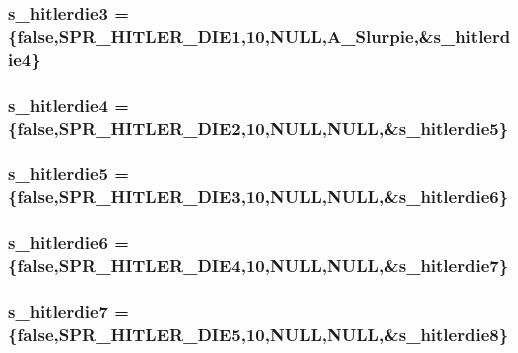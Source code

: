 \label{WL__ACT2_8C_a689a9a34510c375d3e7baf3e44a306b1}
\hypertarget{WL__ACT2_8C_a77cb0b9a6adb6ce65957e289cc3b84d5}{
\subsubsection[{s\_\-hitlerdie3}]{ {\bf s\_\-hitlerdie3} = \{false,SPR\_\-HITLER\_\-DIE1,10,NULL,A\_\-Slurpie,\&{\bf s\_\-hitlerdie4}\}}}
\label{WL__ACT2_8C_a77cb0b9a6adb6ce65957e289cc3b84d5}
\hypertarget{WL__ACT2_8C_af74ae97c693e181be0050cce42a41a60}{
\subsubsection[{s\_\-hitlerdie4}]{ {\bf s\_\-hitlerdie4} = \{false,SPR\_\-HITLER\_\-DIE2,10,NULL,NULL,\&{\bf s\_\-hitlerdie5}\}}}
\label{WL__ACT2_8C_af74ae97c693e181be0050cce42a41a60}
\hypertarget{WL__ACT2_8C_a47e06b78249d62db7664e0362889bdbe}{
\subsubsection[{s\_\-hitlerdie5}]{ {\bf s\_\-hitlerdie5} = \{false,SPR\_\-HITLER\_\-DIE3,10,NULL,NULL,\&{\bf s\_\-hitlerdie6}\}}}
\label{WL__ACT2_8C_a47e06b78249d62db7664e0362889bdbe}
\hypertarget{WL__ACT2_8C_aa9a8ed6fdfd07ba027b5c2568b1b0825}{
\subsubsection[{s\_\-hitlerdie6}]{ {\bf s\_\-hitlerdie6} = \{false,SPR\_\-HITLER\_\-DIE4,10,NULL,NULL,\&{\bf s\_\-hitlerdie7}\}}}
\label{WL__ACT2_8C_aa9a8ed6fdfd07ba027b5c2568b1b0825}
\hypertarget{WL__ACT2_8C_ae016f49d180a3ef7c99c14fbfa4b1fc2}{
\subsubsection[{s\_\-hitlerdie7}]{ {\bf s\_\-hitlerdie7} = \{false,SPR\_\-HITLER\_\-DIE5,10,NULL,NULL,\&{\bf s\_\-hitlerdie8}\}}}
